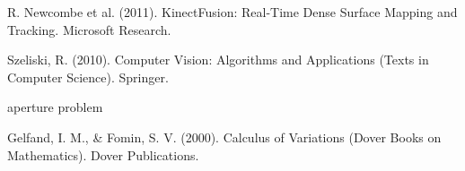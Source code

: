 \documentclass[conference]{IEEEtran}
\begin{document}
\begin{thebibliography}{00}
    R. Newcombe et al. (2011). KinectFusion: Real-Time Dense Surface Mapping and Tracking. Microsoft Research.

    Szeliski, R. (2010). Computer Vision: Algorithms and Applications (Texts in Computer Science). Springer.

    aperture problem

    Gelfand, I. M., \& Fomin, S. V. (2000). Calculus of Variations (Dover Books on Mathematics). Dover Publications.


\end{thebibliography}
\end{document}
